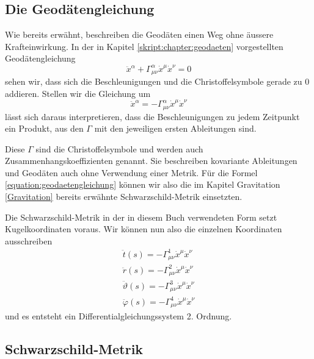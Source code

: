 \begin{refsection}
	\subsection{Die Geodätengleichung}\label{skript:chapter:zeitreisen:geodaetengl}
%
	Wie bereits erwähnt, beschreiben die Geodäten einen Weg ohne äussere Krafteinwirkung. In der in Kapitel \ref{skript:chapter:geodaeten} vorgestellten Geodätengleichung
	\begin{equation}
	\ddot{x}^{\alpha} + \Gamma^{\alpha}_{\mu\nu}\dot{x}^{\mu}\dot{x}^{\nu} = 0
	\end{equation}
    sehen wir, dass sich die Beschleunigungen und die Christoffelsymbole gerade zu $0$ addieren.
	Stellen wir die Gleichung um	
	\begin{equation}\label{equation:geodaetengleichung}
	\ddot{x}^{\alpha} = -\Gamma^{\alpha}_{\mu\nu}\dot{x}^{\mu}\dot{x}^{\nu}
	\end{equation}
	lässt sich daraus interpretieren, dass die Beschleunigungen zu jedem Zeitpunkt ein Produkt, aus den $\Gamma$ mit den jeweiligen ersten Ableitungen sind.
    
	Diese $\Gamma$ sind die Christoffelsymbole und werden auch Zusammenhangskoeffizienten genannt. Sie beschreiben kovariante Ableitungen und Geodäten auch ohne Verwendung einer Metrik. Für die Formel \eqref{equation:geodaetengleichung} können wir also die im Kapitel Gravitation \ref{Gravitation} bereits erwähnte Schwarzschild-Metrik einsetzten.	
	 
	Die Schwarzschild-Metrik in der in diesem Buch verwendeten Form setzt Kugelkoordinaten voraus. Wir können nun also die einzelnen Koordinaten ausschreiben 	
	\begin{equation}\label{skript:chapter:zeitreisen:geodaeten4dim}
	\begin{aligned}
	\ddot{t}(s) = -\Gamma^{1}_{\mu\nu}\dot{x}^{\mu}\dot{x}^{\nu}\\
	\ddot{r}(s) = -\Gamma^{2}_{\mu\nu}\dot{x}^{\mu}\dot{x}^{\nu}\\
	\ddot{\vartheta}(s) = -\Gamma^{3}_{\mu\nu}\dot{x}^{\mu}\dot{x}^{\nu}\\
	\ddot{\varphi}(s) = -\Gamma^{4}_{\mu\nu}\dot{x}^{\mu}\dot{x}^{\nu}	
	\end{aligned}
	\end{equation}
    und es entsteht ein Differentialgleichungssystem 2. Ordnung.

	\subsection{Schwarzschild-Metrik}\label{skript:chapter:zeitreisen:schwarzschildmetrik}
%
	

\end{refsection}
